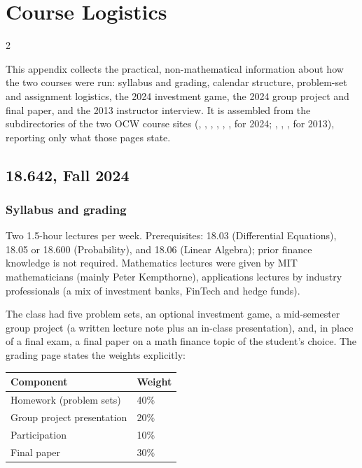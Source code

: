 \chapter{Course Logistics}\label{app:logistics}
\begin{paracol}{2}

This appendix collects the practical, non-mathematical information about how the two courses were
run: syllabus and grading, calendar structure, problem-set and assignment logistics, the 2024
investment game, the 2024 group project and final paper, and the 2013 instructor interview. It is
assembled from the  subdirectories of the two OCW course sites (,
, , , ,
,  for 2024; , ,
,  for 2013), reporting only what those pages state.

\section{18.642, Fall 2024}

\subsection{Syllabus and grading}

Two 1.5-hour lectures per week. Prerequisites: 18.03 (Differential Equations), 18.05 or 18.600
(Probability), and 18.06 (Linear Algebra); prior finance knowledge is not required. Mathematics
lectures were given by MIT mathematicians (mainly Peter Kempthorne), applications lectures by
industry professionals (a mix of investment banks, FinTech and hedge funds).

The class had five problem sets, an optional investment game, a mid-semester group project (a
written lecture note plus an in-class presentation), and, in place of a final exam, a final paper on
a math finance topic of the student's choice. The grading page states the weights explicitly:
\begin{center}
\begin{tabular}{@{}ll@{}}
\toprule
Component & Weight\\
\midrule
Homework (problem sets) & 40\%\\
Group project presentation & 20\%\\
Participation & 10\%\\
Final paper & 30\%\\
\bottomrule
\end{tabular}
\end{center}


\end{paracol}

